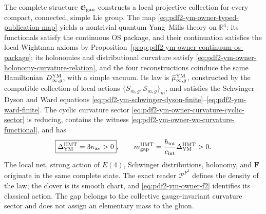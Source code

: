 \begin{theorem}
\label{thm:pdf2-ym-cierre-global}
The complete structure $\mathfrak G_{\rm gau}$ constructs a local projective
collection for every compact, connected, simple Lie group. The map
\eqref{eq:pdf2-ym-owner-typed-publication-map} yields a nontrivial quantum
Yang--Mills theory on $\mathbb R^4$: its functionals satisfy the continuous OS
package, and their continuation satisfies the local Wightman axioms by
Proposition~\ref{prop:pdf2-ym-owner-continuum-os-package}; its
holonomies and distributional
curvature satisfy
\eqref{eq:pdf2-ym-owner-holonomy-curvature-relation}, and the four reconstructions
coinduce the same Hamiltonian $D_{\infty,g}^{\rm YM}$, with a simple vacuum. Its law is
$\widehat\mu_{\infty,g}^{\rm YM}$, constructed by the compatible collection of local
actions $\{S_{m,g},\mathscr S_{m,g}\}_m$, and
satisfies the Schwinger--Dyson and Ward equations
\eqref{eq:pdf2-ym-schwinger-dyson-finite}--\eqref{eq:pdf2-ym-ward-finite}. The cyclic
curvature sector
\eqref{eq:pdf2-ym-owner-curvature-cyclic-sector} is reducing, contains the witness
\eqref{eq:pdf2-ym-owner-wc-curvature-functional}, and has
\begin{equation}\label{eq:pdf2-ym-final-gap}
 \boxed{\Delta_{\rm YM}^{\rm HMT}=3\kappa_{\rm av}>0},
 \qquad
 m_{\rm gap}^{\rm HMT}
 =\frac{\hbar_{\rm int}}{c_{\rm int}}\Delta_{\rm YM}^{\rm HMT}>0.
\end{equation}
The local net, strong action of $E(4)$, Schwinger distributions,
holonomy, and $\mathbf F$ originate in the same complete state. The exact reader
$\mathcal P^{F^2}$ defines the density of the law; the clover is its smooth chart, and
\eqref{eq:pdf2-ym-owner-f2} identifies its classical action. The gap belongs to the collective
gauge-invariant curvature sector and does not assign an elementary mass to the gluon.
\end{theorem}

